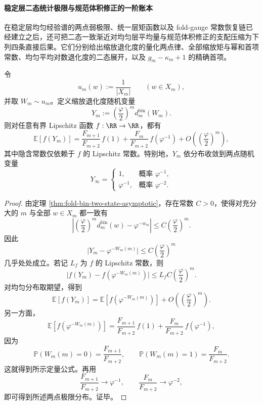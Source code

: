 \paragraph{稳定层二态统计极限与规范体积修正的一阶账本}
在稳定层均匀经验谱的两点弱极限、统一层矩函数以及 fold-gauge 常数恢复链已经建立之后，还可把二态一致渐近对均匀层平均量与规范体积修正的支配压缩为下列四条直接后果。它们分别给出缩放退化度的量化两点律、全部缩放矩与幂和首项常数、均匀平均对数退化度的二态展开，以及 \(g_m-\kappa_m+1\) 的精确首项。

\begin{theorem}[均匀稳定类型下缩放退化度的量化两点极限律]\label{thm:xi-time-part70a-uniform-scaled-degeneracy-quantitative}
令
\[
u_m(w):=\frac{1}{|X_m|}\qquad (w\in X_m),
\]
并取 \(W_m\sim u_m\)。定义缩放退化度随机变量
\[
Y_m:=\left(\frac{\varphi}{2}\right)^m d_m^{\mathrm{bin}}(W_m).
\]
则对任意有界 Lipschitz 函数 \(f:\RR\to\RR\)，都有
\[
\mathbb E[f(Y_m)]
=
\frac{F_{m+1}}{F_{m+2}}\,f(1)
+
\frac{F_m}{F_{m+2}}\,f(\varphi^{-1})
+O\!\left(\left(\frac{\varphi}{2}\right)^m\right),
\]
其中隐含常数仅依赖于 \(f\) 的 Lipschitz 常数。特别地，\(Y_m\) 依分布收敛到两点随机变量
\[
Y_\infty=
\begin{cases}
1,&\text{概率 } \varphi^{-1},\\[3pt]
\varphi^{-1},&\text{概率 } \varphi^{-2}.
\end{cases}
\]
\end{theorem}
\begin{proof}
由定理 \ref{thm:fold-bin-two-state-asymptotic}，存在常数 \(C>0\)，使得对充分大的 \(m\) 与全部 \(w\in X_m\) 都一致有
\[
\left|
\left(\frac{\varphi}{2}\right)^m d_m^{\mathrm{bin}}(w)-\varphi^{-w_m}
\right|
\le C\left(\frac{\varphi}{2}\right)^m.
\]
因此
\[
\bigl|Y_m-\varphi^{-W_m(m)}\bigr|
\le C\left(\frac{\varphi}{2}\right)^m
\]
几乎处处成立。若记 \(L_f\) 为 \(f\) 的 Lipschitz 常数，则
\[
\bigl|f(Y_m)-f(\varphi^{-W_m(m)})\bigr|
\le
L_f C\left(\frac{\varphi}{2}\right)^m.
\]
对均匀分布取期望，得到
\[
\mathbb E[f(Y_m)]
=
\mathbb E[f(\varphi^{-W_m(m)})]
+O\!\left(\left(\frac{\varphi}{2}\right)^m\right).
\]
另一方面，
\[
\mathbb E[f(\varphi^{-W_m(m)})]
=
\frac{F_{m+1}}{F_{m+2}}\,f(1)
+
\frac{F_m}{F_{m+2}}\,f(\varphi^{-1}),
\]
因为
\[
\mathbb P(W_m(m)=0)=\frac{F_{m+1}}{F_{m+2}},
\qquad
\mathbb P(W_m(m)=1)=\frac{F_m}{F_{m+2}}.
\]
这就得到所示定量公式。再用
\[
\frac{F_{m+1}}{F_{m+2}}\to\varphi^{-1},
\qquad
\frac{F_m}{F_{m+2}}\to\varphi^{-2},
\]
即可得到所述两点极限分布。证毕。
\end{proof}

